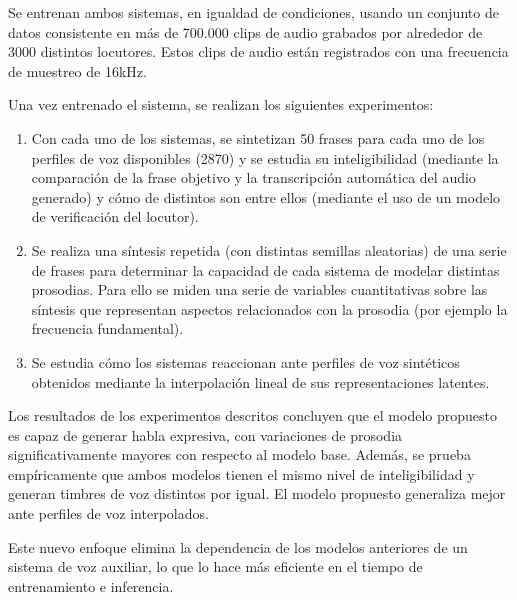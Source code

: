 Se entrenan ambos sistemas, en igualdad de condiciones, usando un conjunto de datos consistente en más de 700.000 clips de audio grabados por alrededor de 3000 distintos locutores. Estos clips de audio están registrados con una frecuencia de muestreo de 16kHz.

Una vez entrenado el sistema, se realizan los siguientes experimentos:

\begin{enumerate}
	\item Con cada uno de los sistemas, se sintetizan 50 frases para cada uno de los perfiles de voz disponibles (2870) y se estudia su inteligibilidad (mediante la comparación de la frase objetivo y la transcripción automática del audio generado) y cómo de distintos son entre ellos (mediante el uso de un modelo de verificación del locutor).
	\item Se realiza una síntesis repetida (con distintas semillas aleatorias) de una serie de frases para determinar la capacidad de cada sistema de modelar distintas prosodias. Para ello se miden una serie de variables cuantitativas sobre las síntesis que representan aspectos relacionados con la prosodia (por ejemplo la frecuencia fundamental).
	\item Se estudia cómo los sistemas reaccionan ante perfiles de voz sintéticos obtenidos mediante la interpolación lineal de sus representaciones latentes.
\end{enumerate}

Los resultados de los experimentos descritos concluyen que el modelo propuesto es capaz de generar habla expresiva, con variaciones de prosodia significativamente mayores con respecto al modelo base. Además, se prueba empíricamente que ambos modelos tienen el mismo nivel de inteligibilidad y generan timbres de voz distintos por igual. El modelo propuesto generaliza mejor ante perfiles de voz interpolados. 

Este nuevo enfoque elimina la dependencia de los modelos anteriores de un sistema de voz auxiliar, lo que lo hace más eficiente en el tiempo de entrenamiento e inferencia.


\clearpage
